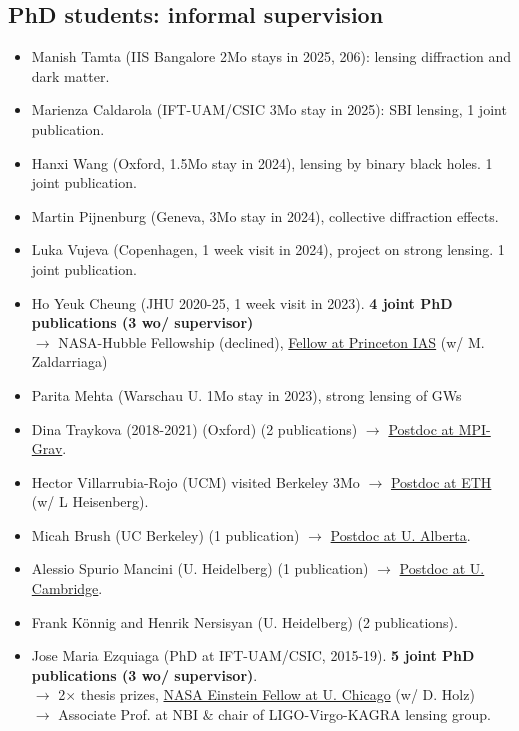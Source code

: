 \documentclass[11pt,a4paper]{article}
\begin{document}
\subsection*{PhD students: informal supervision}
\begin{itemize}\setlength{\itemsep}{1pt}
\item {Manish Tamta} (IIS Bangalore 2Mo stays in 2025, 206): lensing diffraction and dark matter.
  \item {Marienza Caldarola} (IFT-UAM/CSIC 3Mo stay in 2025): SBI lensing, 1 joint publication.
 \item {Hanxi Wang} (Oxford, 1.5Mo stay in 2024), lensing by binary black holes. 1 joint publication.
 \item {Martin Pijnenburg} (Geneva, 3Mo stay in 2024), collective diffraction effects.
\item {Luka Vujeva} (Copenhagen, 1 week visit in 2024), project on strong lensing. 1 joint publication.
 \item {Ho Yeuk Cheung} (JHU 2020-25, 1 week visit in 2023). \textbf{4 joint PhD publications (3 wo/ supervisor)} %
 \\ $\to$    NASA-Hubble Fellowship (declined), \underline{Fellow at Princeton IAS} (w/ M. Zaldarriaga) 

 \item {Parita Mehta} (Warschau U. 1Mo stay in 2023), strong lensing of GWs
  \item {Dina Traykova} (2018-2021) (Oxford) %
  ({2 publications}) $\longrightarrow$ \underline{Postdoc at MPI-Grav}.
  \item Hector Villarrubia-Rojo (UCM) visited Berkeley 3Mo $\longrightarrow$ \underline{Postdoc at ETH} (w/ L Heisenberg).
    \item {Micah Brush} (UC Berkeley) %
    ({1 publication}) $\longrightarrow$ \underline{Postdoc at U. Alberta}.
   \item {Alessio Spurio Mancini} (U. Heidelberg) %
   ({1 publication})  $\longrightarrow$ \underline{Postdoc at U. Cambridge}.
   \item {Frank K\"onnig} and {Henrik Nersisyan} (U. Heidelberg) %
   ({2 publications}).

 \item {Jose Maria Ezquiaga} (PhD at IFT-UAM/CSIC, 2015-19). \textbf{5 joint PhD publications (3 wo/ supervisor)}. %
\\
$\longrightarrow$ 2$\times$ thesis prizes, \underline{NASA Einstein Fellow at U. Chicago} (w/ D. Holz) \\ $\longrightarrow$ {Associate Prof. at NBI \& chair of LIGO-Virgo-KAGRA lensing group}. %
\end{itemize}
\end{document}
